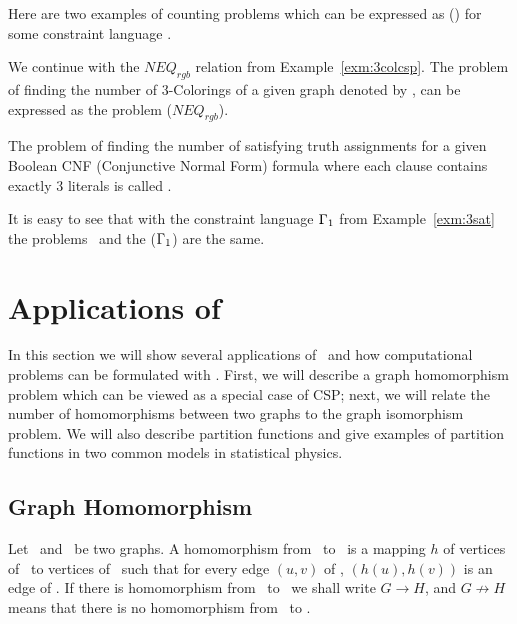 Here are two examples of counting problems which can be expressed as \ccsp(\mrelset) for some
constraint language \mrelset\@.
\begin{example}[\ctcol]
We continue with the \(NEQ_{rgb}\) relation from Example~\ref{exm:3colcsp}\@.
The problem of finding the number of 3-Colorings of a given graph denoted by 
\ctcol, can be expressed as the problem \ccsp(\(NEQ_{rgb}\)).
\end{example}

\begin{example}\label{exm:c3sat}
The problem of finding the number of satisfying truth assignments for a given 
Boolean CNF (Conjunctive Normal Form) formula where each clause contains exactly 3 literals
is called \ctsat\@. 

It is easy to see that with the constraint language \(\Gamma_1\) from Example~\ref{exm:3sat}
the problems \ctsat\ and the \ccsp(\(\Gamma_1\)) are the same.
\end{example} 
\section{Applications of \ccsp} \label{sec:appl}
In this section we will show several applications of \ccsp\ and how computational problems
can be formulated with \ccsp\@. First, we will describe a graph
homomorphism problem which can be viewed as a special case of CSP; next, we will relate
the number of homomorphisms between two graphs to the graph isomorphism problem.
We will also describe partition functions
and give examples of partition functions in two common models in statistical physics.

\subsection*{Graph Homomorphism}
Let \mG\ and \mH\ be two graphs. A homomorphism from \mG\ to \mH\ is a mapping \(h\) of
vertices of \mG\ to vertices of \mH\ such that for every edge \((u,v)\) of \mG,
\((h(u),h(v))\) is an edge of \mH\@. If there is homomorphism from \mG\ to \mH\ 
we shall write \(G\to H\), and \(G \not\to H\) means that there is no homomorphism from
\mG\ to \mH\@.

